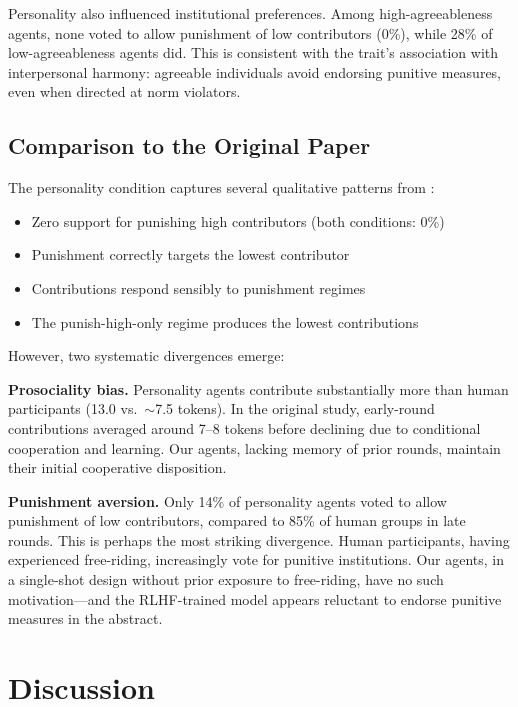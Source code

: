 \documentclass[12pt, a4paper]{article}
\begin{document}
Personality also influenced institutional preferences. Among high-agreeableness agents, none voted to allow punishment of low contributors (0\%), while 28\% of low-agreeableness agents did. This is consistent with the trait's association with interpersonal harmony: agreeable individuals avoid endorsing punitive measures, even when directed at norm violators.

\subsection{Comparison to the Original Paper}

The personality condition captures several qualitative patterns from \citet{ertan2009who}:
\begin{itemize}
  \item Zero support for punishing high contributors (both conditions: 0\%)
  \item Punishment correctly targets the lowest contributor
  \item Contributions respond sensibly to punishment regimes
  \item The punish-high-only regime produces the lowest contributions
\end{itemize}

However, two systematic divergences emerge:

\textbf{Prosociality bias.} Personality agents contribute substantially more than human participants (13.0 vs.\ $\sim$7.5 tokens). In the original study, early-round contributions averaged around 7--8 tokens before declining due to conditional cooperation and learning. Our agents, lacking memory of prior rounds, maintain their initial cooperative disposition.

\textbf{Punishment aversion.} Only 14\% of personality agents voted to allow punishment of low contributors, compared to 85\% of human groups in late rounds. This is perhaps the most striking divergence. Human participants, having experienced free-riding, increasingly vote for punitive institutions. Our agents, in a single-shot design without prior exposure to free-riding, have no such motivation---and the RLHF-trained model appears reluctant to endorse punitive measures in the abstract.

\section{Discussion}
\end{document}
